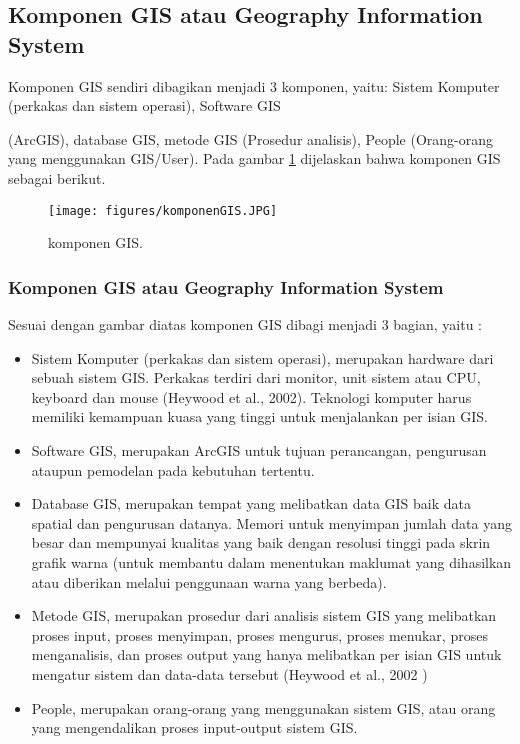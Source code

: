 \subsection{Komponen GIS atau Geography Information System}
Komponen GIS sendiri dibagikan menjadi 3 komponen, yaitu:
Sistem Komputer (perkakas dan sistem operasi), Software GIS

(ArcGIS), database GIS, metode GIS (Prosedur analisis), People (Orang-orang yang menggunakan GIS/User).
Pada gambar \ref{komponen GIS} dijelaskan bahwa komponen GIS sebagai berikut.


\begin{figure}[ht]
	\centerline{\texttt{[image: figures/komponenGIS.JPG]}}
	\caption{komponen GIS.}
	\label{komponen GIS}
	\end{figure}

\subsubsection{Komponen GIS atau Geography Information System}
Sesuai dengan gambar diatas komponen GIS dibagi menjadi 3 bagian, yaitu :
\begin{itemize}
    \item Sistem Komputer (perkakas dan sistem operasi), merupakan hardware dari sebuah sistem GIS. Perkakas terdiri dari monitor, unit sistem atau CPU, keyboard dan mouse (Heywood et al., 2002). Teknologi komputer harus memiliki kemampuan kuasa yang tinggi untuk menjalankan per isian GIS.
    \item Software GIS, merupakan ArcGIS untuk tujuan perancangan, pengurusan ataupun pemodelan pada kebutuhan tertentu.
    \item Database GIS, merupakan tempat yang melibatkan data GIS baik data spatial dan pengurusan datanya. Memori untuk menyimpan jumlah data yang besar dan mempunyai kualitas yang baik dengan resolusi tinggi pada skrin grafik warna (untuk membantu dalam menentukan maklumat yang dihasilkan atau diberikan melalui penggunaan warna yang berbeda).
    \item Metode GIS, merupakan prosedur dari analisis sistem GIS yang melibatkan proses input, proses menyimpan, proses mengurus, proses menukar, proses menganalisis, dan proses output yang hanya melibatkan per isian GIS untuk mengatur sistem dan data-data tersebut (Heywood et al., 2002 )
    \item People, merupakan orang-orang yang menggunakan sistem GIS, atau orang yang mengendalikan proses input-output sistem GIS.
\end{itemize} 



